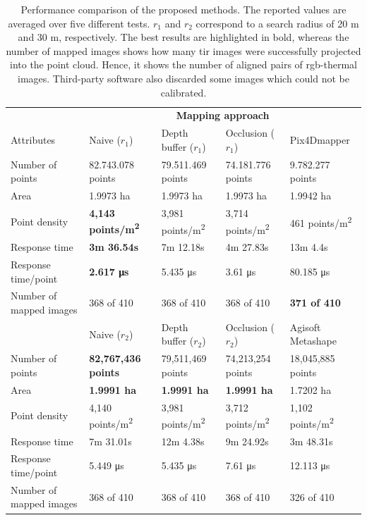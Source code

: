 \renewcommand{\arraystretch}{1.2}
    \begin{table}
    \small
    \caption{Performance comparison of the proposed methods. The reported values are averaged over five different tests. $r_1$ and $r_2$ correspond to a search radius of 20 \si{\meter} and 30 \si{\meter}, respectively. The best results are highlighted in bold, whereas the number of mapped images shows how many \acrshort{tir} images were successfully projected into the point cloud. Hence, it shows the number of aligned pairs of \acrshort{rgb}-thermal images. Third-party software also discarded some images which could not be calibrated. }
    \label{table:thermal_point_cloud_approaches}
    \begin{tabular}{@{}lllll@{} }
    \toprule
    & \multicolumn{4}{c}{\textbf{Mapping approach}} \\
    \cmidrule{2-5}
    Attributes & Naive ($r_1$) & Depth buffer ($r_1$) & Occlusion ($r_1$) & Pix4Dmapper\\
    \midrule
    Number of points & 82.743.078 points & 79.511.469 points & 74.181.776 points & 9.782.277 points\\
    Area & 1.9973 ha & 1.9973 ha & 1.9973 ha & 1.9942 ha\\
    Point density & \textbf{4,143 points/\si{\metre\squared}} & 3,981 points/\si{\metre\squared} & 3,714 points/\si{\metre\squared} & 461 points/\si{\metre\squared}\\
    Response time & \textbf{3m 36.54s} & 7m 12.18s & 4m 27.83s & 13m 4.4s\\
    Response time/point & \textbf{2.617 \si{\micro\second}} & 5.435 \si{\micro\second} & 3.61 \si{\micro\second} & 80.185 \si{\micro\second}\\
    Number of mapped images & 368 of 410 & 368 of 410 & 368 of 410 & \textbf{371 of 410}\\[1mm]
    \cmidrule{2-5}
     & Naive ($r_2$) & Depth buffer ($r_2$) & Occlusion ($r_2$) & Agisoft Metashape\\
    \midrule
    Number of points & \textbf{82,767,436 points} & 79,511,469 points & 74,213,254 points & 18,045,885 points \\
    Area & \textbf{1.9991 ha} & \textbf{1.9991 ha} & \textbf{1.9991 ha} & 1.7202 ha \\
    Point density & 4,140 points/\si{\metre\squared} & 3,981 points/\si{\metre\squared} & 3,712 points/\si{\metre\squared} & 1,102 points/\si{\metre\squared} \\
    Response time & 7m 31.01s & 12m 4.38s & 9m 24.92s & 3m 48.31s \\
    Response time/point & 5.449 \si{\micro\second} & 5.435 \si{\micro\second} & 7.61 \si{\micro\second} & 12.113 \si{\micro\second} \\
    Number of mapped images & 368 of 410 & 368 of 410 & 368 of 410 & 326 of 410\\
    \bottomrule
    \end{tabular}
\end{table}
\renewcommand{\arraystretch}{1}

